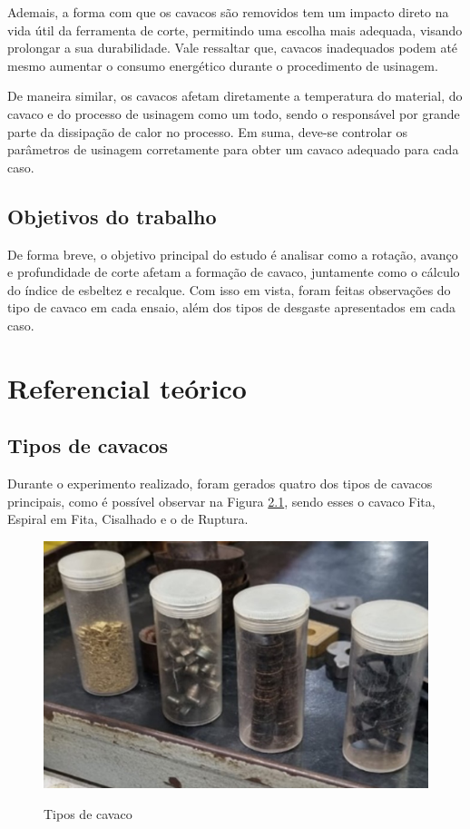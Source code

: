 \documentclass[deposito, acronym, symbols]{fei}
\begin{document}
Ademais, a forma com que os cavacos são removidos tem um impacto direto na vida útil da ferramenta de corte, permitindo uma escolha mais adequada, visando prolongar a sua durabilidade. Vale ressaltar que, cavacos inadequados podem até mesmo aumentar o consumo energético durante o procedimento de usinagem.
	
De maneira similar, os cavacos afetam diretamente a temperatura do material, do cavaco e do processo de usinagem como um todo, sendo o responsável por grande parte da dissipação de calor no processo. Em suma, deve-se controlar os parâmetros de usinagem corretamente para obter um cavaco adequado para cada caso.

\section{Objetivos do trabalho}

De forma breve, o objetivo principal do estudo é analisar como a rotação, avanço e profundidade de corte afetam a formação de cavaco, juntamente como o cálculo do índice de esbeltez e recalque. Com isso em vista, foram feitas observações do tipo de cavaco em cada ensaio, além dos tipos de desgaste apresentados em cada caso.


\chapter{Referencial teórico}

\section{Tipos de cavacos}

Durante o experimento realizado, foram gerados quatro dos tipos de cavacos principais, como é possível observar na Figura \ref{fig:cavacos}, sendo esses o cavaco Fita, Espiral em Fita, Cisalhado e o de Ruptura. 

 \begin{figure}[!htb]
 \centering
    \caption{Tipos de cavaco}
    \includegraphics[width=1\linewidth]{Imagens/Exp03_cavacos.jpg}
    \label{fig:cavacos}
 \end{figure}
 
\end{document}
